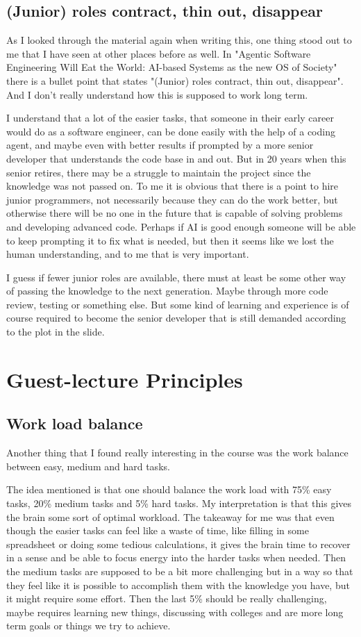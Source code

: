 \documentclass[11pt]{article}
\begin{document}
\subsection{(Junior) roles contract, thin out, disappear}
As I looked through the material again when writing this, one thing stood out to me that I have seen at other places before as well. In "Agentic Software Engineering Will Eat the World:
AI-based Systems as the new OS of Society" there is a bullet point that states "(Junior) roles contract, thin out, disappear". And I don't really understand how this is supposed to work long term. 

I understand that a lot of the easier tasks, that someone in their early career would do as a software engineer, can be done easily with the help of a coding agent, and maybe even with better results if prompted by a more senior developer that understands the code base in and out. But in 20 years when this senior retires, there may be a struggle to maintain the project since the knowledge was not passed on. To me it is obvious that there is a point to hire junior programmers, not necessarily because they can do the work better, but otherwise there will be no one in the future that is capable of solving problems and developing advanced code. Perhaps if AI is good enough someone will be able to keep prompting it to fix what is needed, but then it seems like we lost the human understanding, and to me that is very important. 

I guess if fewer junior roles are available, there must at least be some other way of passing the knowledge to the next generation. Maybe through more code review, testing or something else. But some kind of learning and experience is of course required to become the senior developer that is still demanded according to the plot in the slide. 


\section{Guest-lecture Principles}
\subsection{Work load balance}
Another thing that I found really interesting in the course was the work balance between easy, medium and hard tasks.

The idea mentioned is that one should balance the work load with 75\% easy tasks, 20\% medium tasks and 5\% hard tasks. My interpretation is that this gives the brain some sort of optimal workload. The takeaway for me was that even though the easier tasks can feel like a waste of time, like filling in some spreadsheet or doing some tedious calculations, it gives the brain time to recover in a sense and be able to focus energy into the harder tasks when needed. Then the medium tasks are supposed to be a bit more challenging but in a way so that they feel like it is possible to accomplish them with the knowledge you have, but it might require some effort. Then the last 5\% should be really challenging, maybe requires learning new things, discussing with colleges and are more long term goals or things we try to achieve.
\end{document}
